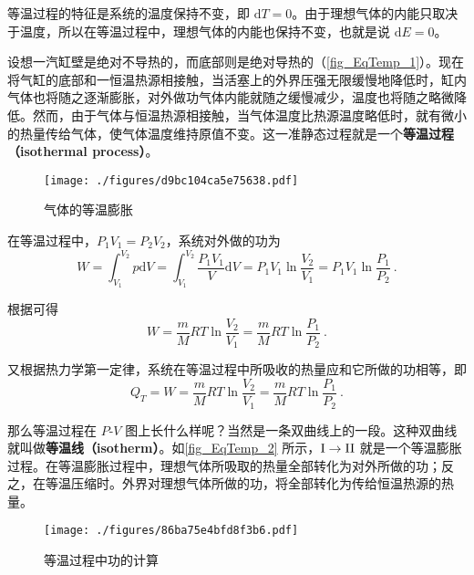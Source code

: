 

等温过程的特征是系统的温度保持不变，即 $\mathrm dT=0$。由于理想气体的内能只取决于温度，所以在等温过程中，理想气体的内能也保持不变，也就是说 $\mathrm dE=0$。

设想一汽缸壁是绝对不导热的，而底部则是绝对导热的（\autoref{fig_EqTemp_1}）。现在将气缸的底部和一恒温热源相接触，当活塞上的外界压强无限缓慢地降低时，缸内气体也将随之逐渐膨胀，对外做功气体内能就随之缓慢减少，温度也将随之略微降低。然而，由于气体与恒温热源相接触，当气体温度比热源温度略低时，就有微小的热量传给气体，使气体温度维持原值不变。这一准静态过程就是一个\textbf{等温过程（isothermal process）}。
\begin{figure}[ht]
\centering
\texttt{[image: ./figures/d9bc104ca5e75638.pdf]}
\caption{气体的等温膨胀} \label{fig_EqTemp_1}
\end{figure}

在等温过程中，$P_1V_1=P_2V_2$，系统对外做的功为
\begin{equation}
W= \int_{V_{1}}^{V_{2}} p \mathrm{d} V=\int_{V_{1}}^{V_{2}} \frac{P_{1} V_{1}}{V} \mathrm{d} V=P_{1} V_{1} \ln \frac{V_{2}}{V_{1}}=P_{1} V_{1} \ln \frac{P_{1}}{P_{2}}~.
\end{equation}

根据可得
\begin{equation}
W=\frac{m}{M} R T \ln \frac{V_{2}}{V_{1}}=\frac{m}{M} R T \ln \frac{P_{1}}{P_{2}}~.
\end{equation}

又根据热力学第一定律，系统在等温过程中所吸收的热量应和它所做的功相等，即
\begin{equation}\label{eq_EqTemp_1}
Q_{T}=W=\frac{m}{M} R T \ln \frac{V_{2}}{V_{1}}=\frac{m}{M} R T \ln \frac{P_{1}}{P_{2}}~.
\end{equation}

那么等温过程在 $P$-$V$ 图上长什么样呢？当然是一条双曲线上的一段。这种双曲线就叫做\textbf{等温线（isotherm）}。如\autoref{fig_EqTemp_2} 所示，$\rm I\to II$ 就是一个等温膨胀过程。在等温膨胀过程中，理想气体所吸取的热量全部转化为对外所做的功；反之，在等温压缩时。外界对理想气体所做的功，将全部转化为传给恒温热源的热量。

\begin{figure}[ht]
\centering
\texttt{[image: ./figures/86ba75e4bfd8f3b6.pdf]}
\caption{等温过程中功的计算} \label{fig_EqTemp_2}
\end{figure}
